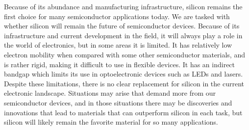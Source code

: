 \documentclass[12pt]{article}
\begin{document}
\begin{flushleft}
Because of its abundance and manufacturing infrastructure,
silicon remains the first choice for many semiconductor
applications today. We are tasked with whether silicon
will remain the future of semiconductor devices. Because
of its infrastructure and current development in the
field, it will always play a role in the world of electronics,
but in some areas it is limited. It has relatively
low electron mobility when compared with some other
semiconductor materials, and is rather rigid, making
it difficult to use in flexible devices. It has an
indirect bandgap which limits its use in optoelectronic
devices such as LEDs and lasers. Despite these limitations,
there is no clear replacement for silicon in the current
electronic landscape. Situations may arise that demand
more from our semiconductor devices, and in those situations
there may be discoveries and innovations that lead
to materials that can outperform silicon in each task,
but silicon will likely remain the favorite material
for so many applications.



\newpage
\nocite{*}
\printbibliography

\end{flushleft}
\end{document}
